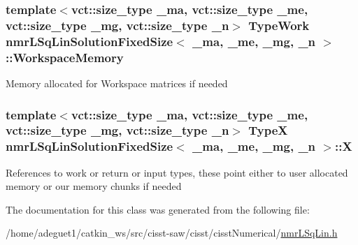 \hypertarget{classnmr_l_sq_lin_solution_fixed_size_a3718294e665cb353e17c58bae35e91ef}{
\subsubsection[{Workspace\-Memory}]{\setlength{\rightskip}{0pt plus 5cm}template$<$vct\-::size\-\_\-type \-\_\-ma, vct\-::size\-\_\-type \-\_\-me, vct\-::size\-\_\-type \-\_\-mg, vct\-::size\-\_\-type \-\_\-n$>$ {\bf Type\-Work} {\bf nmr\-L\-Sq\-Lin\-Solution\-Fixed\-Size}$<$ \-\_\-ma, \-\_\-me, \-\_\-mg, \-\_\-n $>$\-::Workspace\-Memory\hspace{0.3cm}{\ttfamily [protected]}}}\label{classnmr_l_sq_lin_solution_fixed_size_a3718294e665cb353e17c58bae35e91ef}
Memory allocated for Workspace matrices if needed \hypertarget{classnmr_l_sq_lin_solution_fixed_size_ae6be321dc3efeb73c08a9b66ca650c59}{
\subsubsection[{X}]{\setlength{\rightskip}{0pt plus 5cm}template$<$vct\-::size\-\_\-type \-\_\-ma, vct\-::size\-\_\-type \-\_\-me, vct\-::size\-\_\-type \-\_\-mg, vct\-::size\-\_\-type \-\_\-n$>$ {\bf Type\-X} {\bf nmr\-L\-Sq\-Lin\-Solution\-Fixed\-Size}$<$ \-\_\-ma, \-\_\-me, \-\_\-mg, \-\_\-n $>$\-::X\hspace{0.3cm}{\ttfamily [protected]}}}\label{classnmr_l_sq_lin_solution_fixed_size_ae6be321dc3efeb73c08a9b66ca650c59}
References to work or return or input types, these point either to user allocated memory or our memory chunks if needed 

The documentation for this class was generated from the following file\-:\begin{DoxyCompactItemize}
\item 
/home/adeguet1/catkin\-\_\-ws/src/cisst-\/saw/cisst/cisst\-Numerical/\hyperlink{nmr_l_sq_lin_8h}{nmr\-L\-Sq\-Lin.\-h}\end{DoxyCompactItemize}
